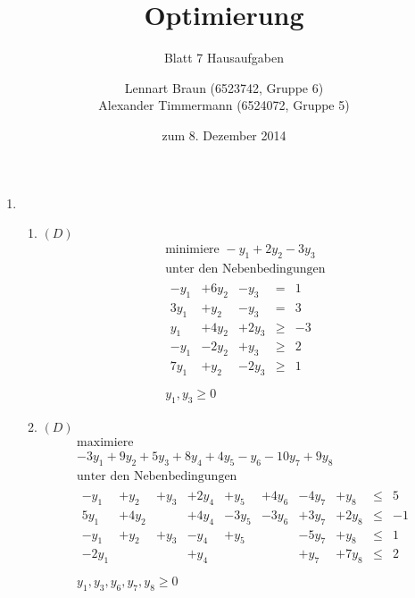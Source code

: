 \documentclass[a4paper]{scrartcl}
\title{Optimierung}
\subtitle{Blatt 7 Hausaufgaben}
\author{
	Lennart Braun (6523742, Gruppe 6) \\
    Alexander Timmermann (6524072, Gruppe 5)
}
\date{zum 8. Dezember 2014}
\begin{document}
\maketitle

\begin{enumerate}[label=\bfseries\arabic*.]
    \item %
        \begin{enumerate}
            \item $(D)$
                \begin{equation}
                    \begin{gathered}
                        \text{minimiere }
                        -y_1 +2y_2 -3y_3 \\
                        \text{unter den Nebenbedingungen} \\
                        \begin{array}{rrrcr}
                            -y_1 & +6y_2 & -y_3 & = & 1 \\
                            3y_1 & +y_2 & -y_3 & = & 3 \\
                            y_1 & +4y_2 & +2y_3 & \geq & -3 \\
                            -y_1 & -2y_2 & +y_3 & \geq & 2 \\
                            7y_1 & +y_2 & -2y_3 & \geq & 1 \\
                        \end{array} \\
                        y_1, y_3 \geq 0
                    \end{gathered}
                \end{equation}

            \item $(D)$
                \begin{equation}
                    \begin{gathered}
                        \text{maximiere} \\
                        -3y_1 +9y_2 +5y_3 +8y_4 +4y_5 -y_6 -10y_7 +9y_8 \\
                        \text{unter den Nebenbedingungen} \\
                        \begin{array}{rrrrrrrrcr}
                            -y_1 & +y_2 & +y_3 & +2y_4 & +y_5 & +4y_6 & -4y_7 & +y_8 & \leq & 5 \\
                            5y_1 & +4y_2 & & +4y_4 & -3y_5 & -3y_6 & +3y_7 & +2y_8 & \leq & -1 \\
                            -y_1 & +y_2 & +y_3 & -y_4 & +y_5 & & -5y_7 & +y_8 & \leq & 1 \\
                            -2y_1 & & & +y_4 & & & +y_7 & +7y_8 & \leq & 2 \\
                        \end{array} \\
                        y_1, y_3, y_6, y_7, y_8 \geq 0
                    \end{gathered}
                \end{equation}


\end{enumerate}
\end{enumerate}
\end{document}
